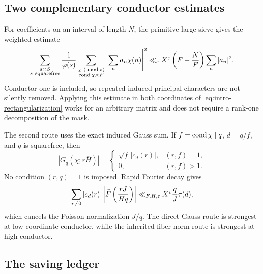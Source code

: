 \subsection{Two complementary conductor estimates}

For coefficients on an interval of length \(N\), the primitive large
sieve \citep[Chapter~7]{IwaniecKowalski2004} gives the weighted estimate
\begin{equation}
 \sum_{\substack{s\asymp S\\s\ {\rm squarefree}}}\frac1{\varphi(s)}
 \sum_{\substack{\chi\ (\bmod s)\\\operatorname{cond}\chi\asymp F}}
 \left|\sum_na_n\chi(n)\right|^2
 \ll_\varepsilon X^\varepsilon
 \left(F+\frac NF\right)\sum_n|a_n|^2.
 \label{eq:intro-exact-conductor-LS}
\end{equation}
Conductor one is included, so repeated induced principal characters are
not silently removed.  Applying this estimate in both coordinates of
\eqref{eq:intro-rectangularization} works for an arbitrary matrix and
does not require a rank-one decomposition of the mask.

The second route uses the exact induced Gauss sum.  If
\(f=\operatorname{cond}\chi\mid q\), \(d=q/f\), and \(q\) is squarefree, then
\begin{equation}
 |G_q(\chi;r\overline H)|
 =\begin{cases}
   \sqrt f\,|c_d(r)|,&(r,f)=1,\\
   0,&(r,f)>1.
  \end{cases}
 \label{eq:intro-induced-Gauss}
\end{equation}
No condition \((r,q)=1\) is imposed.  Rapid Fourier decay gives
\begin{equation}
 \sum_{r\ne0}|c_d(r)|
 \left|\widehat F\left(\frac{rJ}{Hq}\right)\right|
 \ll_{F,H,\varepsilon}X^\varepsilon\frac qJ\tau(d),
 \label{eq:intro-Ramanujan-weight}
\end{equation}
which cancels the Poisson normalization \(J/q\).  The direct-Gauss
route is strongest at low coordinate conductor, while the inherited
fiber-norm route is strongest at high conductor.

\subsection{The saving ledger}

